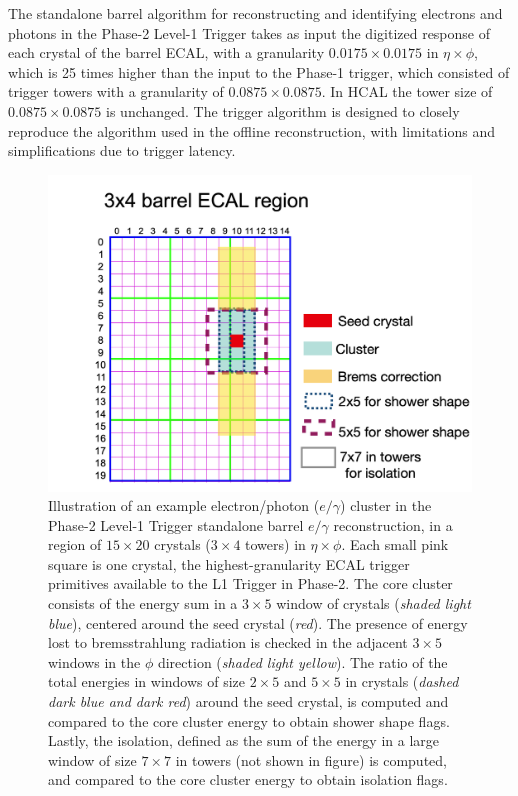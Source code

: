 The standalone barrel algorithm for reconstructing and identifying electrons and photons in the Phase-2 Level-1 Trigger takes as input the digitized response of each crystal of the barrel ECAL, with a granularity $0.0175 \times 0.0175$ in $\eta \times \phi$, which is 25 times higher than the input to the Phase-1 trigger, which consisted of trigger towers with a granularity of $0.0875 \times 0.0875$. In HCAL the tower size of $0.0875 \times 0.0875$ is unchanged. The trigger algorithm is designed to closely reproduce the algorithm used in the offline reconstruction, with limitations and simplifications due to trigger latency. 

\begin{figure}[ht]
    \centering
    \includegraphics[width=12cm]{figures/ch-3-phase2/phase-2-cluster-footprint.png}
    \caption{Illustration of an example electron/photon ($e/\gamma$) cluster in the Phase-2 Level-1 Trigger standalone barrel $e/\gamma$ reconstruction, in a region of $15\times 20$ crystals ($3\times 4$ towers) in $\eta \times \phi$. Each small pink square is one crystal, the highest-granularity ECAL trigger primitives available to the L1 Trigger in Phase-2. The core cluster consists of the energy sum in a $3\times 5$ window of crystals (\textit{shaded light blue}), centered around the seed crystal (\textit{red}). The presence of energy lost to bremsstrahlung radiation is checked in the adjacent $3\times 5$ windows in the $\phi$ direction (\textit{shaded light yellow}). The ratio of the total energies in windows of size $2\times 5$ and $5\times 5$ in crystals (\textit{dashed dark blue and dark red}) around the seed crystal, is computed and compared to the core cluster energy to obtain shower shape flags. Lastly, the isolation, defined as the sum of the energy in a large window of size $7\times 7$ in towers (not shown in figure) is computed, and compared to the core cluster energy to obtain isolation flags.}
    \label{fig:phase-2-cluster-footprint}
\end{figure}


